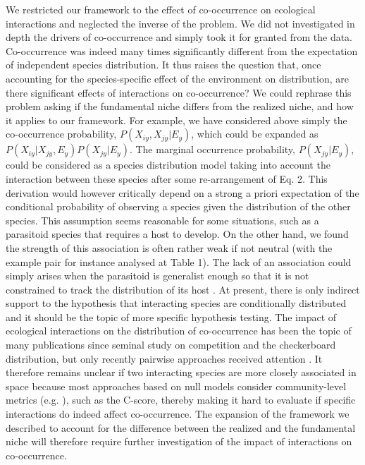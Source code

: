 \documentclass[12pt]{article}
\begin{document}
We restricted our framework to the effect of co-occurrence on ecological
interactions and neglected the inverse of the problem. We did not investigated
in depth the drivers of co-occurrence and simply took it for granted from the
data. Co-occurrence was indeed many times significantly different from the
expectation of independent species distribution. It thus raises the question
that, once accounting for the species-specific effect of the environment on
distribution, are there significant effects of interactions on co-occurrence?
We could rephrase this problem asking if the fundamental niche differs from
the realized niche, and how it applies to our framework. For example, we have
considered above simply the co-occurrence probability, $P(X_{iy},X_{jy}|E_y)$,
which could be expanded as  $P(X_{iy}|X_{jy},E_y) P(X_{jy}| E_y )$. The
marginal occurrence probability, $P(X_{jy}|E_y )$, could be considered as a
species distribution model taking into account the interaction between these
species after some re-arrangement of Eq. 2. This derivation would however
critically depend on a strong a priori expectation of the conditional
probability of observing a species given the distribution of the other
species. This assumption seems reasonable for some situations, such as a
parasitoid species that requires a host to develop. On the other hand, we
found the strength of this association is often rather weak if not neutral
(with the example pair for instance analysed at Table 1). The lack of an
association could simply arises when the parasitoid is generalist enough so
that it is not constrained to track the distribution of its host
\citep{Cazelles2015}. At present, there is only indirect support to the
hypothesis that interacting species are conditionally distributed and it
should be the topic of more specific hypothesis testing. The impact of
ecological interactions on the distribution of co-occurrence has been the
topic of many publications since \citeal{Diamond1975} seminal study on
competition and the checkerboard distribution, but only recently pairwise
approaches received attention \citep{Veech2013}. It therefore remains unclear
if two interacting species are more closely associated in space because most
approaches based on null models consider community-level metrics (e.g.
\citealt{Gotelli2000}), such as the C-score, thereby making it hard to
evaluate if specific interactions do indeed affect co-occurrence. The
expansion of the framework we described to account for the difference between
the realized and the fundamental niche will therefore require further
investigation of the impact of interactions on co-occurrence.
\end{document}

